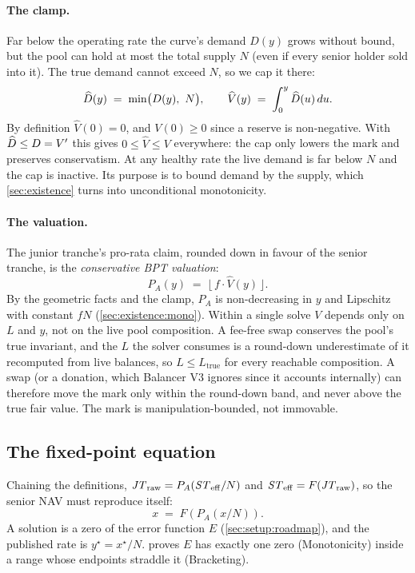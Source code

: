 \paragraph{The clamp.}
Far below the operating rate the curve's demand $D(y)$ grows without
bound, but the pool can hold at most the total supply $N$ (even if every
senior holder sold into it). The true demand cannot exceed $N$, so we
cap it there:
\[
  \widehat{D}(y) \;=\; \min\bigl(D(y),\ N\bigr),
  \qquad
  \widehat{V}(y) \;=\; \int_0^y \widehat{D}(u)\,du.
\]
By definition $\widehat{V}(0) = 0$, and $V(0) \geq 0$ since a reserve
is non-negative. With $\widehat{D} \leq D = V'$ this gives
$0 \leq \widehat{V} \leq V$ everywhere: the cap only lowers the mark and
preserves conservatism. At any healthy
rate the live demand is far below $N$ and the cap is inactive. Its
purpose is to bound demand by the supply, which \cref{sec:existence}
turns into unconditional monotonicity.

\paragraph{The valuation.}
The junior tranche's pro-rata claim, rounded down in favour of the
senior tranche, is the \emph{conservative BPT valuation}:
\begin{equation}
  P_A(y) \;=\; \bigl\lfloor\, f \cdot \widehat{V}(y) \,\bigr\rfloor.
  \label{eq:PA}
\end{equation}
By the geometric facts and the clamp, $P_A$ is non-decreasing in $y$ and
Lipschitz with constant $f N$ (\cref{sec:existence:mono}). Within a
single solve $V$ depends only on $L$ and $y$, not on the live pool
composition. A fee-free swap conserves the pool's true invariant, and
the $L$ the solver consumes is a round-down underestimate of it
recomputed from live balances, so $L \leq L_{\mathrm{true}}$ for every
reachable composition. A swap (or a donation, which Balancer V3 ignores
since it accounts internally) can therefore move the mark only within
the round-down band, and never above the true fair value. The mark is
manipulation-bounded, not immovable.

\subsection{The fixed-point equation}
\label{sec:setup:circularity}

Chaining the definitions, $\mathit{JT}_{\mathrm{raw}} = P_A(\mathit{ST}_{\mathrm{eff}}/N)$ and
$\mathit{ST}_{\mathrm{eff}} = F(\mathit{JT}_{\mathrm{raw}})$, so the senior NAV must reproduce itself:
\begin{equation}
  x \;=\; F\!\left(P_A\!\left(x / N\right)\right).
  \label{eq:fixed-point}
\end{equation}
A solution is a zero of the error function $E$
(\cref{sec:setup:roadmap}), and the published rate is
$y^\star = x^\star / N$.  proves $E$ has exactly one
zero (Monotonicity) inside a range whose endpoints straddle it
(Bracketing).
